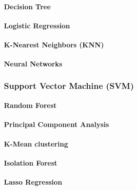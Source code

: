 \documentclass[../../main.tex]{subfiles}
\begin{document}
\vspace{8pt}
\paragraph{Decision Tree}


\vspace{8pt}
\paragraph{Logistic Regression}


\vspace{8pt}
\paragraph{K-Nearest Neighbors (KNN)}


\vspace{8pt}
\paragraph{Neural Networks}


\vspace{8pt}
\subsubsection{Support Vector Machine (SVM)}


\vspace{8pt}
\paragraph{Random Forest}


\vspace{8pt}
\paragraph{Principal Component Analysis}


\vspace{8pt}
\paragraph{K-Mean clustering}


\vspace{8pt}
\paragraph{Isolation Forest}


\vspace{8pt}
\paragraph{Lasso Regression}

\end{document}
